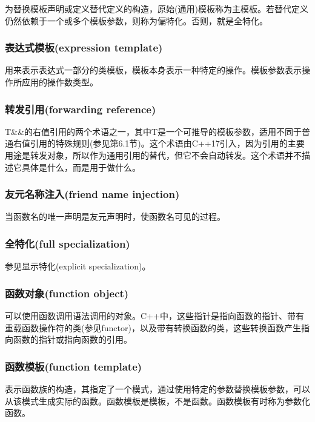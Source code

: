 为替换模板声明或定义替代定义的构造，原始(通用)模板称为主模板。若替代定义仍然依赖于一个或多个模板参数，则称为偏特化。否则，就是全特化。

\subsubsection{表达式模板(expression template)}

用来表示表达式一部分的类模板，模板本身表示一种特定的操作。模板参数表示操作所应用的操作数类型。

\subsubsection{转发引用(forwarding reference)}

T\&\&的右值引用的两个术语之一，其中T是一个可推导的模板参数，适用不同于普通右值引用的特殊规则(参见第6.1节)。这个术语由C++17引入，因为引用的主要用途是转发对象，所以作为通用引用的替代，但它不会自动转发。这个术语并不描述它具体是什么，而是用于做什么。

\subsubsection{友元名称注入(friend name injection)}

当函数名的唯一声明是友元声明时，使函数名可见的过程。

\subsubsection{全特化(full specialization)}

参见显示特化(explicit specialization)。

\subsubsection{函数对象(function object)}

可以使用函数调用语法调用的对象。C++中，这些指针是指向函数的指针、带有重载函数操作符的类(参见functor)，以及带有转换函数的类，这些转换函数产生指向函数的指针或指向函数的引用。

\subsubsection{函数模板(function template)}

表示函数族的构造，其指定了一个模式，通过使用特定的参数替换模板参数，可以从该模式生成实际的函数。函数模板是模板，不是函数。函数模板有时称为参数化函数。


